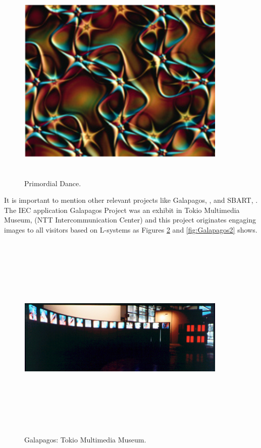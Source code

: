 \begin{figure}
\captionsetup{justification=centering,margin=2cm}
\centering
\setlength\fboxsep{0pt}
\setlength\fboxrule{0.7pt}
\includegraphics[width=10cm,height=10cm,keepaspectratio]{img/PrimordialDance.png}
\caption{Primordial Dance.}
\label{fig:PrimordialD}
\end{figure}


It is important to mention other relevant projects like Galapagos,
\cite{sims1997interactivity}, and SBART, \cite{unemi2000sbart}. The IEC
application Galapagos Project was an exhibit in Tokio Multimedia Museum, (NTT
Intercommunication Center) and this project originates engaging images to all
visitors based on L-systems as Figures \ref{fig:Galapagos1} and \ref{fig:Galapagos2}
shows.

\begin{figure}
\captionsetup{justification=centering,margin=2cm}
\centering
\setlength\fboxsep{0pt}
\setlength\fboxrule{0.7pt}
\includegraphics[width=10cm,height=10cm,keepaspectratio]{img/Galapagos1.png}
\caption{Galapagos: Tokio Multimedia Museum.}
\label{fig:Galapagos1}
\end{figure}

